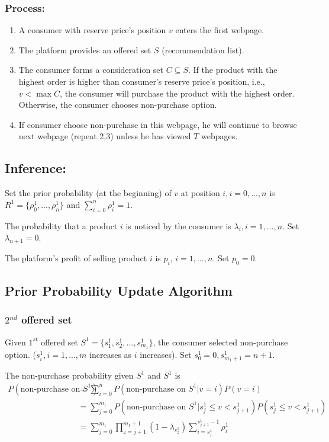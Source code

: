 \documentclass[11pt,a4paper]{article}
\begin{document}
\subsubsection*{Process:}
\begin{enumerate}
    \item A consumer with reserve price's position $v$ enters the first webpage.
    \item The platform provides an offered set $S$ (recommendation list).
    \item The consumer forms a consideration set $C\subseteq S$. If the product with the highest order is higher than consumer’s reserve price's position, i.e., $v<\max C$, the consumer will purchase the product with the highest order. Otherwise, the consumer chooses non-purchase option.
    \item If consumer choose non-purchase in this webpage, he will continue to browse next webpage (repeat 2,3) unless he has viewed $T$ webpages.
\end{enumerate}

\subsection*{Inference:}
Set the prior probability (at the beginning) of $v$ at position $i,i=0,...,n$ is $R^1=\{\rho^1_0,...,\rho^1_n\}$ and $\sum_{i=0}^n\rho^1_i=1$.

The probability that a product $i$ is noticed by the consumer is $\lambda_i,i=1,...,n$. Set $\lambda_{n+1}=0$.

The platform's profit of selling product $i$ is $p_i$, $i=1,...,n$. Set $p_0=0$.

\subsection{Prior Probability Update Algorithm}
\subsubsection*{$2^{nd}$ offered set}
Given $1^{st}$ offered set $S^1=\{s_1^1,s_2^1,...,s_{m_1}^1\}$, the consumer selected non-purchase option. ($s_i^1,i=1,...,m$ increases as $i$ increases). Set $s_0^1=0,s_{m_1+1}^1=n+1$.

The non-purchase probability given $S^1$ and $S^1$ is
\begin{equation}
    \begin{aligned}
        P(\text{non-purchase on }S^1)&=\sum_{i=0}^nP(\text{non-purchase on }S^1\vert v=i)P(v=i)\\
        &=\sum_{j=0}^{m_1} P(\text{non-purchase on }S^1\vert s_{j}^1\leq v< s_{j+1}^1)P(s_{j}^1\leq v< s_{j+1}^1)\\
        &=\sum_{j=0}^{{m}_1} \prod_{z=j+1}^{{m_1}+1}(1-\lambda_{s_{z}^1})\sum_{i=s_j^1}^{s_{j+1}^1-1}\rho_i^1\\
    \end{aligned}
    \nonumber
\end{equation}
\end{document}
